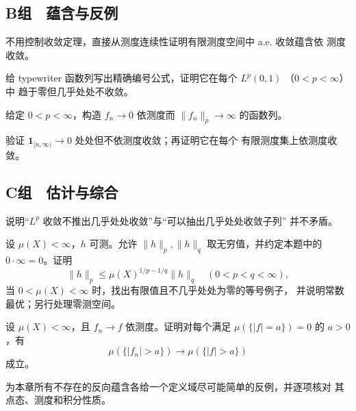 \subsection*{B组　蕴含与反例}
\begin{enumerate}[label=\textbf{\thechapter.\arabic*.},resume]
不用控制收敛定理，直接从测度连续性证明有限测度空间中 a.e. 收敛蕴含依
测度收敛。

给 typewriter 函数列写出精确编号公式，证明它在每个 \(L^p(0,1)\)
（\(0<p<\infty\)）中
趋于零但几乎处处不收敛。

给定 \(0<p<\infty\)，构造 \(f_n\to0\) 依测度而
\(\|f_n\|_p\to\infty\) 的函数列。

验证 \(\mathbf1_{[n,\infty)}\to0\) 处处但不依测度收敛；再证明它在每个
有限测度集上依测度收敛。

\end{enumerate}
\subsection*{C组　估计与综合}
\begin{enumerate}[label=\textbf{\thechapter.\arabic*.},resume]
说明“\(L^p\) 收敛不推出几乎处处收敛”与“可以抽出几乎处处收敛子列”
并不矛盾。

设 \(\mu(X)<\infty\)，\(h\) 可测。允许 \(\|h\|_p,\|h\|_q\)
取无穷值，并约定本题中的 \(0\cdot\infty=0\)。证明
\[
 \|h\|_p\le\mu(X)^{1/p-1/q}\|h\|_q
\quad(0<p<q<\infty),
\]
当 \(0<\mu(X)<\infty\) 时，找出有限值且不几乎处处为零的等号例子，
并说明常数最优；另行处理零测空间。

设 \(\mu(X)<\infty\)，且 \(f_n\to f\) 依测度。证明对每个满足
\(\mu(\{|f|=a\})=0\) 的 \(a>0\)，有
\[
 \mu(\{|f_n|>a\})\to\mu(\{|f|>a\})
\]
成立。

为本章所有不存在的反向蕴含各给一个定义域尽可能简单的反例，并逐项核对
其点态、测度和积分性质。
\end{enumerate}
